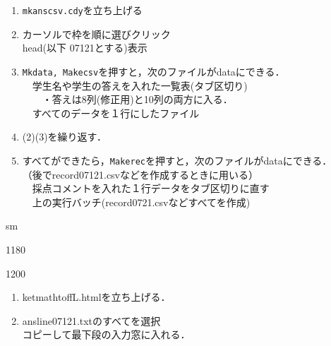 \documentclass[landscape,10pt]{ujarticle}
\newcommand{\slidepage}[1][s]{%
\setcounter{ketpicctra}{18}%
\if#1m \setcounter{ketpicctra}{1}\fi
\hypersetup{linkcolor=black}%

\begin{layer}{118}{0}
\putnotee{122}{-\theketpicctra.05}{\small\thepage/\pageref{pageend}}
\end{layer}\hypersetup{linkcolor=blue}

}
\begin{document}
\begin{enumerate}[(1)]
\item
\verb|mkanscsv.cdy|を立ち上げる\vspace{-1mm}
\item
カーソルで枠を順に選びクリック\\
head(以下 07121とする)表示\vspace{-1mm}
\item
\verb|Mkdata, Makecsv|を押すと，次のファイルがdataにできる．\\
　学生名や学生の答えを入れた一覧表(タブ区切り)\\
　\Ltab{35mm}{}　・答えは8列(修正用)と10列の両方に入る．\\
　すべてのデータを１行にしたファイル\vspace{-1mm}
\item
(2)(3)を繰り返す．\vspace{-1mm}
\item
すべてができたら，\verb|Makerec|を押すと，次のファイルがdataにできる．\\
（後でrecord07121.csvなどを作成するときに用いる）\\
　採点コメントを入れた１行データをタブ区切りに直す\\
　上の実行バッチ(record0721.csvなどすべてを作成)
\end{enumerate}



\vspace*{18mm}

\slidepage

\begin{layer}{120}{0}
\end{layer}

\begin{enumerate}[(1)]
\item
ketmathtoffL.htmlを立ち上げる．\vspace{-2mm}
\item
ansline07121.txtのすべてを選択\\
コピーして最下段の入力窓に入れる．\vspace{-2mm}\\
\end{enumerate}
\end{document}
